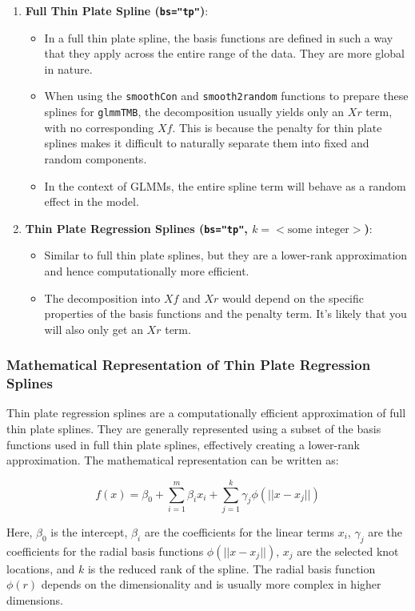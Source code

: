 \documentclass[12pt, twoside,hidelinks]{article}
\theoremstyle{definition}
\numberwithin{equation}{section}
\begin{document}
\begin{enumerate}
    \item \textbf{Full Thin Plate Spline (\texttt{bs="tp"})}:
    \begin{itemize}
        \item In a full thin plate spline, the basis functions are defined in such a way that they apply across the entire range of the data. They are more global in nature.
        \item When using the \texttt{smoothCon} and \texttt{smooth2random} functions to prepare these splines for \texttt{glmmTMB}, the decomposition usually yields only an \(Xr\) term, with no corresponding \(Xf\). This is because the penalty for thin plate splines makes it difficult to naturally separate them into fixed and random components.
        \item In the context of GLMMs, the entire spline term will behave as a random effect in the model.
    \end{itemize}
    
    \item \textbf{Thin Plate Regression Splines (\texttt{bs="tp"}, \(k=<\text{some integer}>\))}:
    \begin{itemize}
        \item Similar to full thin plate splines, but they are a lower-rank approximation and hence computationally more efficient.
        \item The decomposition into \(Xf\) and \(Xr\) would depend on the specific properties of the basis functions and the penalty term. It's likely that you will also only get an \(Xr\) term.
    \end{itemize}
\end{enumerate}


\subsubsection*{Mathematical Representation of Thin Plate Regression Splines}

Thin plate regression splines are a computationally efficient approximation of full thin plate splines. They are generally represented using a subset of the basis functions used in full thin plate splines, effectively creating a lower-rank approximation. The mathematical representation can be written as:

\[
f(x) = \beta_0 + \sum_{i=1}^{m} \beta_i x_i + \sum_{j=1}^{k} \gamma_j \phi(|| x - x_{j} ||)
\]

Here, \( \beta_0 \) is the intercept, \( \beta_i \) are the coefficients for the linear terms \( x_i \), \( \gamma_j \) are the coefficients for the radial basis functions \( \phi(|| x - x_{j} ||) \), \( x_j \) are the selected knot locations, and \( k \) is the reduced rank of the spline. The radial basis function \( \phi(r) \) depends on the dimensionality and is usually more complex in higher dimensions.
\end{document}
